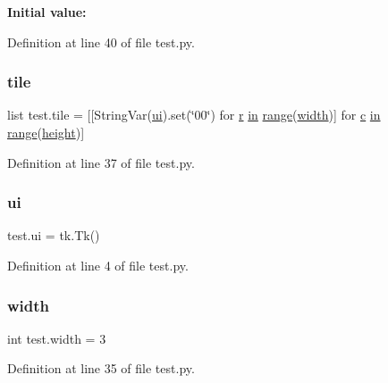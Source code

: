 {\bfseries Initial value\+:}
\begin{DoxyCode}{0}
\DoxyCodeLine{1 =  [[OptionMenu(ui, tile[r][c], \textcolor{stringliteral}{"00"},\textcolor{stringliteral}{"01"},\textcolor{stringliteral}{"02"},\textcolor{stringliteral}{"03"},\textcolor{stringliteral}{"04"})}
\DoxyCodeLine{2       \textcolor{keywordflow}{for} r \textcolor{keywordflow}{in} range(width)] \textcolor{keywordflow}{for} c \textcolor{keywordflow}{in} range(height)]}

\end{DoxyCode}


Definition at line 40 of file test.\+py.

\mbox{\label{namespacetest_a07a6334fbd8825c05776b33e39049434}} 
\subsubsection{\texorpdfstring{tile}{tile}}
{\footnotesize\ttfamily list test.\+tile = \mbox{[}\mbox{[}String\+Var(\mbox{\hyperlink{namespacetest_a2e4e93323d5077e198ecdc67c609e488}{ui}}).set(\char`\"{}00\char`\"{}) for \mbox{\hyperlink{_s_d_l__opengl_8h_a42ce7cdc612e53abee15043f80220d97}{r}} \mbox{\hyperlink{_s_d_l__opengl__glext_8h_a83ad0ee7f1e06b59c90271716e689080}{in}} \mbox{\hyperlink{_s_d_l__opengl__glext_8h_a73b00379db2c7ac5e30a3aa2954a50ee}{range}}(\mbox{\hyperlink{_s_d_l__opengl_8h_a9a82cf3caff84cabc4598e2619faac17}{width}})\mbox{]} for \mbox{\hyperlink{_s_d_l__opengl__glext_8h_a1f2d7f8147412c43ba2303a56f97ee73}{c}} \mbox{\hyperlink{_s_d_l__opengl__glext_8h_a83ad0ee7f1e06b59c90271716e689080}{in}} \mbox{\hyperlink{_s_d_l__opengl__glext_8h_a73b00379db2c7ac5e30a3aa2954a50ee}{range}}(\mbox{\hyperlink{_s_d_l__opengl_8h_aa352f2804b9902ac30769c00dde75d5f}{height}})\mbox{]}}



Definition at line 37 of file test.\+py.

\mbox{\label{namespacetest_a2e4e93323d5077e198ecdc67c609e488}} 
\subsubsection{\texorpdfstring{ui}{ui}}
{\footnotesize\ttfamily test.\+ui = tk.\+Tk()}



Definition at line 4 of file test.\+py.

\mbox{\label{namespacetest_a064937db856e36c5389241650eb91307}} 
\subsubsection{\texorpdfstring{width}{width}}
{\footnotesize\ttfamily int test.\+width = 3}



Definition at line 35 of file test.\+py.

